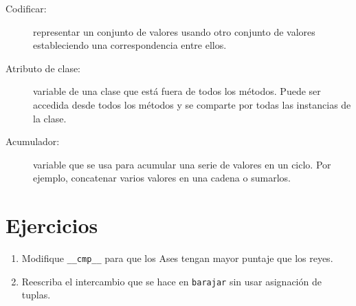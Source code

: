\begin{description}

\item[Codificar:]  representar un conjunto de valores usando
otro conjunto de valores estableciendo una correspondencia 
entre ellos.

\item[Atributo de clase:] variable de una clase que está
fuera de todos los métodos. Puede ser accedida desde todos los
métodos y se comparte por todas las instancias de la clase.

\item[Acumulador:] variable que se usa para acumular una
serie de valores en un ciclo. Por ejemplo, concatenar varios
valores en una cadena o sumarlos.


\end{description}

\section{Ejercicios}
\begin{enumerate}

\item Modifique \texttt{\_\_cmp\_\_} para que los Ases tengan mayor puntaje que los reyes.

\item Reescriba el intercambio que se hace en \texttt{barajar} sin usar asignación de
tuplas.

\end{enumerate}